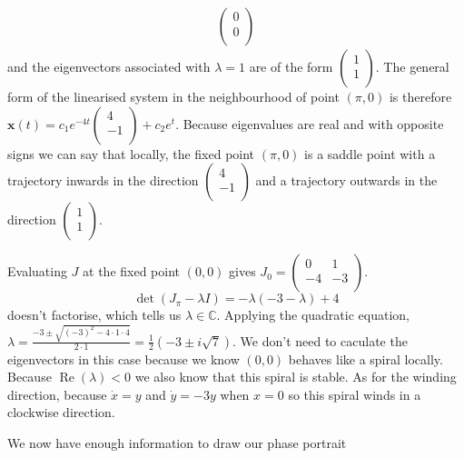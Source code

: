 \documentclass[10pt]{article}
\begin{document}
\begin{enumerate}
\begin{align*}
\begin{pmatrix}
            0 \\
            0 \\
          \end{pmatrix}
        \end{align*}
        and the eigenvectors associated with $\lambda = 1$ are of the form $
          \begin{pmatrix}
            1 \\
            1 \\
          \end{pmatrix}$. The general form of the linearised system in the
          neighbourhood of point $(\pi, 0)$ is therefore
          $\mathbf{x}(t) = c_1e^{-4t}
          \begin{pmatrix}
            4 \\
            -1 \\
          \end{pmatrix}
          + c_2e^t$. Because eigenvalues are real and with opposite signs we
          can say that locally, the fixed point $(\pi, 0)$ is a saddle point
          with a trajectory inwards in the direction $
          \begin{pmatrix}
            4 \\
            -1 \\
          \end{pmatrix}
          $ and a trajectory outwards in the direction $
          \begin{pmatrix}
            1 \\
            1 \\
          \end{pmatrix}
          $.

      Evaluating $J$ at the fixed point $(0,0)$ gives
        $
          J_0 = \begin{pmatrix}
            0 & 1 \\
            -4 & -3 \\
          \end{pmatrix}
        $.
        $$\det(J_\pi - \lambda I) = -\lambda(-3-\lambda) + 4$$ doesn't
        factorise, which tells us $\lambda \in \mathbb{C}$. Applying the
        quadratic equation,
        $\lambda = \frac{-3\pm\sqrt{(-3)^2-4\cdot 1 \cdot 4}}{2 \cdot 1} = \tfrac{1}{2}(-3 \pm i\sqrt{7})$.
        We don't need to caculate the eigenvectors in this case because we know
        $(0, 0)$ behaves like a spiral locally. Because
        $\operatorname{Re}(\lambda) < 0$ we also know that this spiral is
        stable. As for the winding direction, because $\dot x = y$ and
        $\dot y = -3y$ when $x = 0$ so this spiral winds in a clockwise
        direction.

        We now have enough information to draw our phase portrait



  \end{enumerate}
\end{document}
